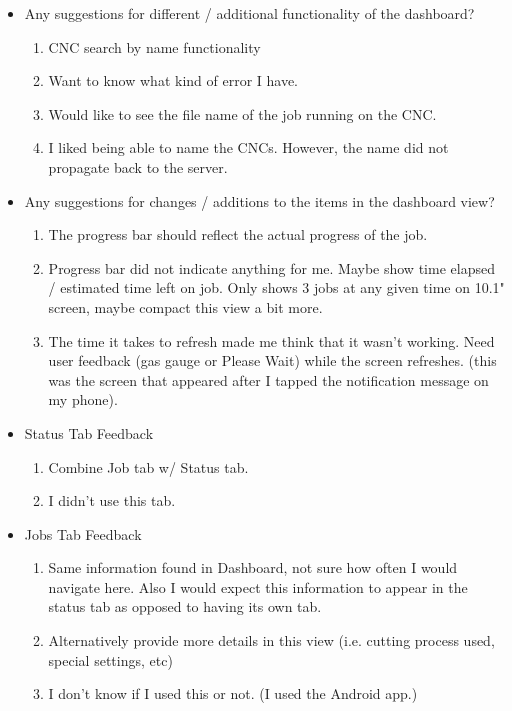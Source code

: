 \documentclass[12pt,letterpaper,titlepage]{article}
\newlength{\wideitemsep}
\let\olditem\item
\renewcommand{\item}{\setlength{\itemsep}{\wideitemsep}\olditem}
\begin{document}
\begin{itemize}
\item Any suggestions for different / additional functionality of the dashboard?
\begin{enumerate}
\item CNC search by name functionality
\item Want to know what kind of error I have.
\item Would like to see the file name of the job running on the CNC.
\item I liked being able to name the CNCs. However, the name did not propagate back to the server. 
\end{enumerate}


\item Any suggestions for changes / additions to the items in the dashboard view?
\begin{enumerate}
\item The progress bar should reflect the actual progress of the job.
\item Progress bar did not indicate anything for me. Maybe show time elapsed / estimated time left on job. Only shows 3 jobs at any given time on 10.1" screen, maybe compact this view a bit more.
\item The time it takes to refresh made me think that it wasn’t working. Need user feedback (gas gauge or Please Wait) while the screen refreshes. (this was the screen that appeared after I tapped the notification message on my phone).
\end{enumerate}

\item Status Tab Feedback
\begin{enumerate}
\item Combine Job tab w/ Status tab.
\item I didn't use this tab.
\end{enumerate}

\item Jobs Tab Feedback
\begin{enumerate}
\item Same information found in Dashboard, not sure how often I would navigate here. Also I would expect this information to appear in the status tab as opposed to having its own tab.
\item Alternatively provide more details in this view (i.e. cutting process used, special settings, etc)
\item I don't know if I used this or not. (I used the Android app.) 
\end{enumerate}


\end{itemize}
\end{document}
